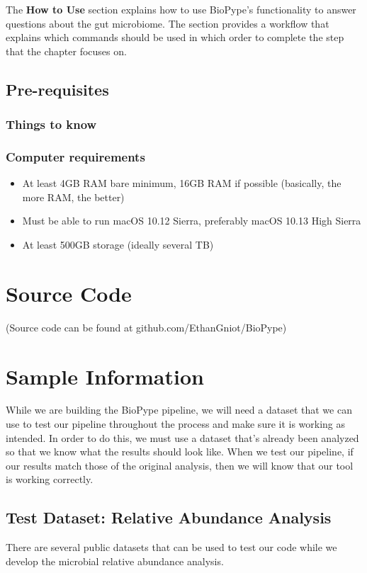 The \textbf{How to Use} section explains how to use BioPype's functionality to answer questions about the gut microbiome. The section provides a workflow that explains which commands should be used in which order to complete the step that the chapter focuses on. 

\section{Pre-requisites}
\subsection*{Things to know}
\subsection*{Computer requirements}
\begin{itemize}
    \item At least 4GB RAM bare minimum, 16GB RAM if possible (basically, the more RAM, the better)
    \item Must be able to run macOS 10.12 Sierra, preferably macOS 10.13 High Sierra
    \item At least 500GB storage (ideally several TB)
\end{itemize}

\chapter{Source Code}
(Source code can be found at github.com/EthanGniot/BioPype)

\chapter{Sample Information}

While we are building the BioPype pipeline, we will need a dataset that we can use to test our pipeline throughout the process and make sure it is working as intended. In order to do this, we must use a dataset that's already been analyzed so that we know what the results should look like. When we test our pipeline, if our results match those of the original analysis, then we will know that our tool is working correctly.

\section{Test Dataset: Relative Abundance Analysis}
There are several public datasets that can be used to test our code while we develop the microbial relative abundance analysis.

